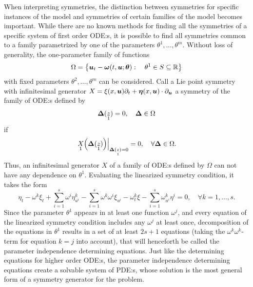 When interpreting symmetries, the distinction between symmetries for specific instances of the model and symmetries of certain families of the model becomes important.
While there are no known methods for finding all the symmetries of a specific system of first order ODE:s, it is possible to find all symmetries common to a family parametrized by one of the parameters \(\theta^1, \dots, \theta^m\).
Without loss of generality, the one-parameter family of functions
\begin{equation*} %
  \Omega = \left\{\vect{u}_t - \vect{\omega}(t, \vect{u}; \vect{\theta}):\quad \theta^1 \in S \subseteq \reals \right\}
\end{equation*}
with fixed parameters \(\theta^2, \dots, \theta^m\) can be considered.
Call a Lie point symmetry with infinitesimal generator \(X = \xi(x, \vect{u}) \partial_t + \vect{\eta}(x, \vect{u}) \cdot \partial_{\vect{u}}\) a symmetry of the family of ODE:s defined by
\begin{equation*}
  \vect{\Delta}(\prolong{z}{1}) = 0 ,\quad \vect{\Delta} \in \Omega
\end{equation*}
if
\begin{equation*}
  \eval{\prolong{X}{1}\left(\vect{\Delta}(\prolong{z}{1})\right)}_{\vect{\Delta}(\prolong{z}{1}) = 0} = 0 ,\quad \forall \vect{\Delta} \in \Omega.
\end{equation*}
Thus, an infinitesimal generator \(X\) of a family of ODE:s defined by \(\Omega\) can not have any dependence on \(\theta^1\).
Evaluating the linearized symmetry condition, it takes the form
\begin{equation*}
  \eta_t - \omega^k \xi_t + \sum_{i=1}^s \omega^i \eta^k_{u^i} - \sum_{i=1}^s \omega^k \omega^i \xi_{u^i} -
  \omega^k_t \xi - \sum_{i=1}^s \omega^k_{u^i} \eta^i = 0 ,\quad \forall k = 1, \dots, s.
\end{equation*}
Since the parameter \(\theta^1\) appears in at least one function \(\omega^j\), and every equation of the linearized symmetry condition includes any \(\omega^j\) at least once, decomposition of the equations in \(\theta^1\) results in a set of at least \(2 s + 1\) equations (taking the \(\omega^k \omega^k\)-term for equation \(k = j\) into account), that will henceforth be called the parameter independence determining equations.
Just like the determining equations for higher order ODE:s, the parameter independence determining equations create a solvable system of PDE:s, whose solution is the most general form of a symmetry generator for the problem.

